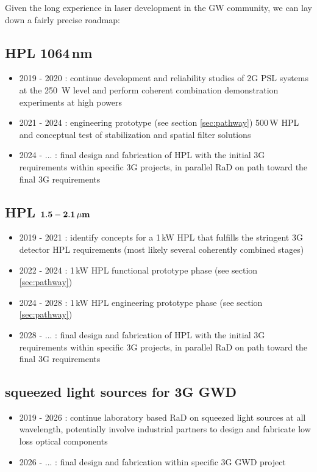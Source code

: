 Given the long experience in laser development in the \ac{GW} community, we can lay down a fairly precise roadmap: 

\subsection*{\ac{HPL} 1064\,nm}
\begin{itemize}
	\item 2019 - 2020 : continue development and reliability studies of \ac{2G}  \ac{PSL} systems at the 250\, W level and perform coherent combination demonstration experiments at high powers
	\item 2021 - 2024 : engineering prototype (see section \ref{sec:pathway}) 500\,W \ac{HPL} and conceptual test of stabilization and spatial filter solutions
	\item 2024 - ... : final design and fabrication of \ac{HPL} with the initial \ac{3G}   requirements within specific \ac{3G}   projects, in parallel \ac{RaD} on path toward the final \ac{3G}   requirements 
\end{itemize} 


\subsection*{\ac{HPL} ${\bf 1.5 - 2.1 \, {\bf \mu m}}$}
\begin{itemize}
	\item 2019 - 2021 : identify concepts for a 1\,kW \ac{HPL} that fulfills the stringent \ac{3G}   detector \ac{HPL} requirements (most likely several coherently combined stages)
	\item 2022 - 2024 : 1\,kW \ac{HPL} functional prototype phase (see section \ref{sec:pathway})
	\item 2024 - 2028 : 1\,kW \ac{HPL} engineering prototype phase (see section \ref{sec:pathway})
	\item 2028 - ... : final design and fabrication of \ac{HPL} with the initial \ac{3G}   requirements within specific \ac{3G}   projects, in parallel \ac{RaD} on path toward the final \ac{3G}   requirements
\end{itemize} 


\subsection*{squeezed light sources for \ac{3G}   \ac{GWD}  }
\begin{itemize}
	\item 2019 - 2026 : continue laboratory based \ac{RaD} on squeezed light sources at all wavelength, potentially involve industrial partners to design and fabricate low loss optical components
	\item 2026 - ... : final design and fabrication within specific \ac{3G}   \ac{GWD} project
\end{itemize}

